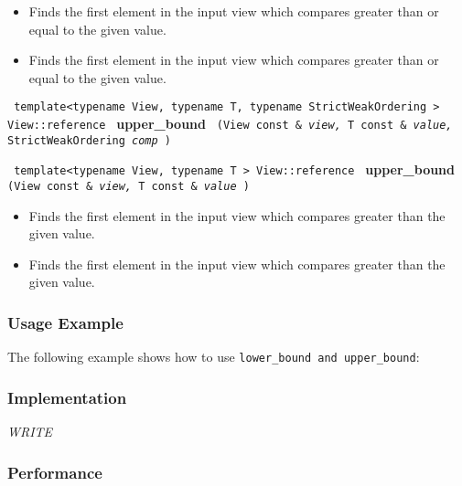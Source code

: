 \begin{itemize}
\item
Finds the first element in the input view which compares greater than or equal to the given value. 
\item
Finds the first element in the input view which compares greater than or equal to the given value. 
\end{itemize}
 
\noindent
\texttt{%
template<typename View, typename T, typename StrictWeakOrdering >
\newline
View::reference 
}
\newline
\textbf{upper\_bound}%
\texttt{%
(View const \&
\textit{view,}%
T const \&
\textit{value,}%
StrictWeakOrdering 
\textit{comp}%
)
}
\vspace{0.4cm}

\noindent
\texttt{%
template<typename View, typename T >
\newline
View::reference 
}
\newline
\textbf{upper\_bound}%
\texttt{%
(View const \&
\textit{view,}%
T const \&
\textit{value}%
)
}

\begin{itemize}
\item
Finds the first element in the input view which compares greater than the given value. 
\item
Finds the first element in the input view which compares greater than the given value. 
\end{itemize}

\subsubsection{Usage Example} %

The following example shows how to use \texttt{lower\_bound and upper\_bound}:

 
\subsubsection{Implementation} %

\textit{WRITE}

\subsubsection{Performance} %

